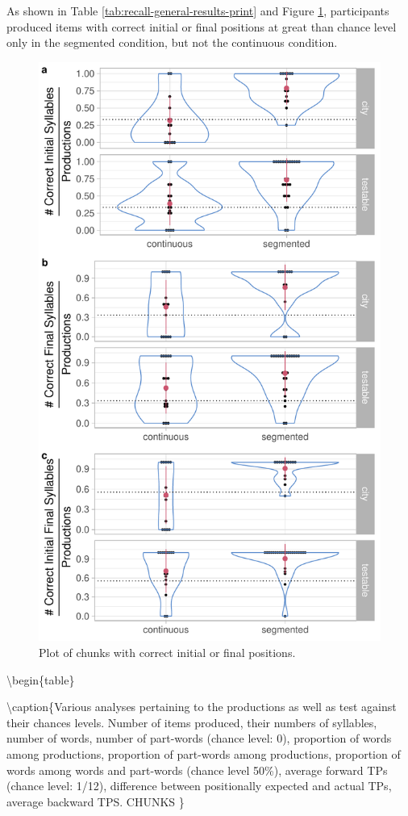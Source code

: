 \documentclass[]{article}
\begin{document}
As shown in Table \ref{tab:recall-general-results-print} and Figure
\ref{fig:recall-positions-plot}, participants produced items with
correct initial or final positions at great than chance level only in
the segmented condition, but not the continuous condition.

\begin{figure}

{\centering \includegraphics[width=0.8\linewidth]{segmentation_recall_combined_files/figure-latex/recall-positions-plot-1} 

}

\caption{Plot of chunks with correct initial or final positions.}\label{fig:recall-positions-plot}
\end{figure}

\textbackslash{}begin\{table\}

\textbackslash{}caption\{\label{tab:recall-general-results-print}Various
analyses pertaining to the productions as well as test against their
chances levels. Number of items produced, their numbers of syllables,
number of words, number of part-words (chance level: 0), proportion of
words among productions, proportion of part-words among productions,
proportion of words among words and part-words (chance level 50\%),
average forward TPs (chance level: 1/12), difference between
positionally expected and actual TPs, average backward TPS. CHUNKS \}
\centering
\end{document}
